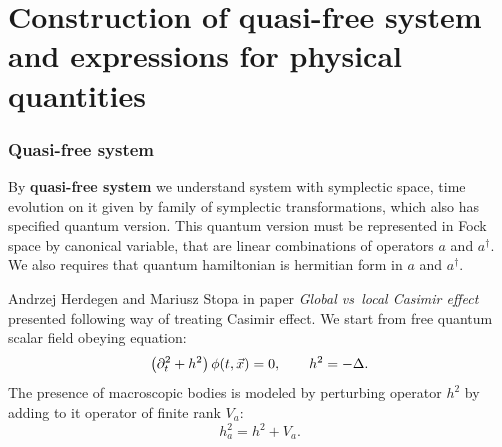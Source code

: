 \documentclass[10pt,t]{beamer}
\begin{document}
\section{Construction of quasi-free system and expressions
  for physical quantities}



\begin{frame}
  \frametitle{Quasi-free system}


  By \textbf{quasi-free system} we understand system with symplectic space,
  time evolution on it given by family of symplectic transformations, which
  also has specified quantum version. This quantum version must be
  represented in Fock space by canonical variable, that are linear
  combinations of operators $a$ and $a^{ \dagger }$. We also requires that
  quantum hamiltonian is hermitian form in $a$ and $a^{ \dagger }$.

  Andrzej Herdegen and Mariusz Stopa in paper \textit{Global vs~local
    Casimir effect} \parencite{Herdegen-Stopa-Global-vs-local-ETC-2010}
  presented following way of treating Casimir effect. We start from
  free quantum scalar field obeying equation:
  \begin{equation}
    \label{eq:Construction-of-quasi-free-system-ETC-01}
    \left( \partial_{ t }^{ 2 } + h^{ 2 } \right) \phi( t, \vec{x} ) = 0, \qquad
    h^{ 2 } = -\Delta.
  \end{equation}
  The presence of macroscopic bodies is modeled by perturbing operator
  $h^{ 2 }$ by adding to it operator of finite rank $V_{ a }$:
  \begin{equation}
    \label{eq:Epstein-Glaser-24-A}
    h_{ a }^{ 2 } = h^{ 2 } + V_{ a }.
  \end{equation}

\end{frame}
\end{document}
